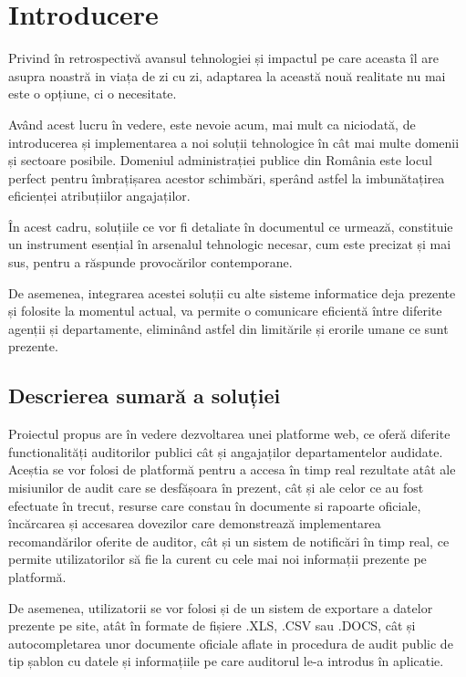 \chapter*{Introducere} 
Privind în retrospectivă avansul tehnologiei și impactul pe care aceasta îl are asupra noastră in viața de zi cu zi, adaptarea la această nouă realitate nu mai este o opțiune, ci o necesitate.
\par Având acest lucru în vedere, este nevoie acum, mai mult ca niciodată, de introducerea și implementarea a noi soluții tehnologice în cât mai multe domenii și sectoare posibile. Domeniul administrației publice din România este locul perfect pentru îmbrațișarea acestor schimbări, sperând astfel la imbunătațirea eficienței atribuțiilor angajaților.
\par În acest cadru, soluțiile ce vor fi detaliate în documentul ce urmează, constituie un instrument esențial în arsenalul tehnologic necesar, cum este precizat și mai sus, pentru a răspunde provocărilor contemporane.
\par De asemenea, integrarea acestei soluții cu alte sisteme informatice deja prezente și folosite la momentul actual, va permite o comunicare eficientă între diferite agenții și departamente, eliminând astfel din limitările și erorile umane ce sunt prezente.
\section*{Descrierea sumară a soluției}
Proiectul propus are în vedere dezvoltarea unei platforme web, ce oferă diferite functionalități auditorilor publici cât și angajaților departamentelor audidate. Aceștia se vor folosi de platformă pentru a accesa în timp real rezultate atât ale misiunilor de audit care se desfășoara în prezent, cât și ale celor ce au fost efectuate în trecut, resurse care constau în documente si rapoarte oficiale, 
încărcarea și accesarea dovezilor care demonstrează implementarea recomandărilor oferite de auditor, cât și un sistem de notificări în timp real, ce permite utilizatorilor să fie la curent cu cele mai noi informații prezente pe platformă.
\par De asemenea, utilizatorii se vor folosi și de un sistem de exportare a datelor prezente pe site, atât în formate de fișiere .XLS, .CSV sau .DOCS, cât și autocompletarea unor documente oficiale aflate in procedura de audit public de tip șablon cu datele și informațiile pe care auditorul le-a introdus în aplicatie.
